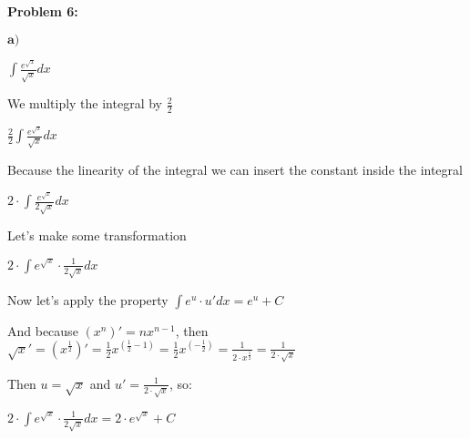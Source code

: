 \textbf{Problem 6:}

\singlespacing

$\textbf{a)}$

\singlespacing

$\int \frac{e^{\sqrt{x}}}{\sqrt{x}}dx$

\singlespacing

We multiply the integral by $\frac{2}{2}$

\singlespacing

$\frac{2}{2}\int \frac{e^{\sqrt{x}}}{\sqrt{x}}dx$

\singlespacing

Because the linearity of the integral we can insert the constant inside the integral

\singlespacing

$2\cdot\int \frac{e^{\sqrt{x}}}{2\sqrt{x}}dx$

\singlespacing

Let's make some transformation

\singlespacing

$2\cdot\int e^{\sqrt{x}}\cdot \frac{1}{2\sqrt{x}}dx$

\singlespacing

Now let's apply the property $\int e^u \cdot u'dx  = e^u + C$

\singlespacing

And because $(x^n)' = nx^{n-1}$, then $\sqrt{x}' = (x^\frac{1}{2})' =
    \frac{1}{2}x^{(\frac{1}{2}-1)}  = \frac{1}{2}x^{(-\frac{1}{2})}= \frac{1}{2\cdot x^\frac{1}{2}}
    = \frac{1}{2\cdot \sqrt{x}}$

\singlespacing

Then $u = \sqrt{x}$ and $u' = \frac{1}{2\cdot \sqrt{x}}$, so:

\singlespacing

$2\cdot\int e^{\sqrt{x}}\cdot \frac{1}{2\sqrt{x}}dx = 2\cdot e^{\sqrt{x}} + C$

\singlespacing



